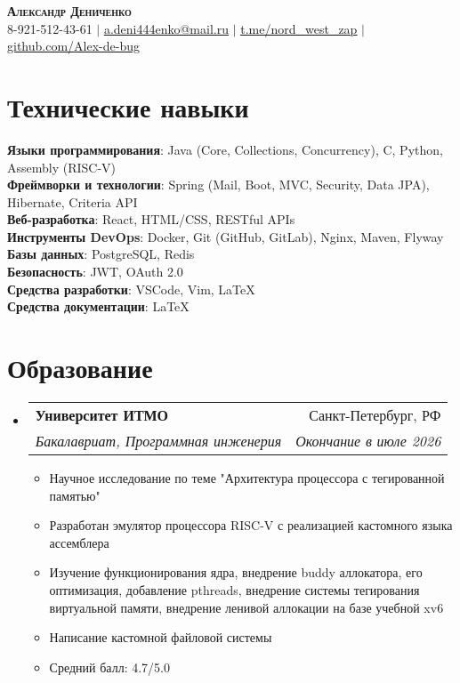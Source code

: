 \documentclass[letterpaper,11pt]{article}
\makeatletter
\newcommand{\resumeItem}[1]{
  \item\small{
    {#1 \vspace{-2pt}}
  }
}
\newcommand{\resumeSubheading}[4]{
  \vspace{-2pt}\item
    \begin{tabular*}{0.97\textwidth}[t]{l@{\extracolsep{\fill}}r}
      \textbf{#1} & #2 \\
      \textit{\small#3} & \textit{\small #4} \\
    \end{tabular*}\vspace{-7pt}
}
\newcommand{\resumeSubHeadingListStart}{\begin{itemize}[leftmargin=0.15in, label={}]}
\newcommand{\resumeSubHeadingListEnd}{\end{itemize}}
\newcommand{\resumeItemListStart}{\begin{itemize}}
\newcommand{\resumeItemListEnd}{\end{itemize}\vspace{-5pt}}
\makeatother
\begin{document}


\begin{center}
    \textbf{\Huge \scshape Александр Дениченко} \\ \vspace{1pt}
    \small 8-921-512-43-61 $|$ \href{mailto:a.deni444enko@mail.ru}{\underline{a.deni444enko@mail.ru}} $|$ 
    \href{https://t.me/nord_west_zap}{\underline{t.me/nord\_west\_zap}} $|$
    \href{https://github.com/Alex-de-bug}{\underline{github.com/Alex-de-bug}}
\end{center}

\section{Технические навыки}
 \begin{itemize}[leftmargin=0.15in, label={}]
    \small{\item{
     \textbf{Языки программирования}{: Java (Core, Collections, Concurrency), C, Python, Assembly (RISC-V)} \\
     \textbf{Фреймворки и технологии}{: Spring (Mail, Boot, MVC, Security, Data JPA), Hibernate, Criteria API} \\
     \textbf{Веб-разработка}{: React, HTML/CSS, RESTful APIs} \\
     \textbf{Инструменты DevOps}{: Docker, Git (GitHub, GitLab), Nginx, Maven, Flyway} \\
     \textbf{Базы данных}{: PostgreSQL, Redis} \\
     \textbf{Безопасность}{: JWT, OAuth 2.0} \\
     \textbf{Средства разработки}{: VSCode, Vim, LaTeX} \\
     \textbf{Средства документации}{: LaTeX}
    }}
 \end{itemize}


\section{Образование}
  \resumeSubHeadingListStart
    \resumeSubheading
      {Университет ИТМО}{Санкт-Петербург, РФ}
      {Бакалавриат, Программная инженерия}{Окончание в июле 2026}
          \resumeItemListStart
            \resumeItem{Научное исследование по теме "Архитектура процессора с тегированной памятью"}
            \resumeItem{Разработан эмулятор процессора RISC-V с реализацией кастомного языка ассемблера}
            \resumeItem{Изучение функционирования ядра, внедрение buddy аллокатора, его оптимизация, добавление pthreads, внедрение системы тегирования виртуальной памяти, внедрение ленивой аллокации на базе учебной xv6}
            \resumeItem{Написание кастомной файловой системы}
            \resumeItem{Средний балл: 4.7/5.0}
        \resumeItemListEnd
  \resumeSubHeadingListEnd
\end{document}
